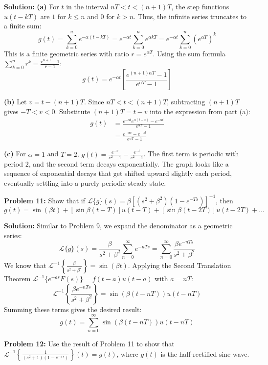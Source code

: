 \documentclass[11pt, letterpaper]{article}
\theoremstyle{definition}
\theoremstyle{remark}
\begin{document}
\textbf{Solution:}
\textbf{(a)} For $t$ in the interval $nT < t < (n+1)T$, the step functions $u(t-kT)$ are $1$ for $k \le n$ and $0$ for $k > n$. Thus, the infinite series truncates to a finite sum:
\[ g(t) = \sum_{k=0}^n e^{-\alpha(t-kT)} = e^{-\alpha t} \sum_{k=0}^n e^{\alpha kT} = e^{-\alpha t} \sum_{k=0}^n (e^{\alpha T})^k \]
This is a finite geometric series with ratio $r = e^{\alpha T}$. Using the sum formula $\sum_{k=0}^n r^k = \frac{r^{n+1} - 1}{r - 1}$:
\[ g(t) = e^{-\alpha t} \left[ \frac{e^{(n+1)\alpha T} - 1}{e^{\alpha T} - 1} \right] \]

\textbf{(b)} Let $v = t - (n+1)T$. Since $nT < t < (n+1)T$, subtracting $(n+1)T$ gives $-T < v < 0$.
Substitute $(n+1)T = t - v$ into the expression from part (a):
\begin{align*}
    g(t) &= \frac{e^{-\alpha t} e^{\alpha(t-v)} - e^{-\alpha t}}{e^{\alpha T} - 1} \\
    &= \frac{e^{-\alpha v} - e^{-\alpha t}}{e^{\alpha T} - 1}
\end{align*}

\textbf{(c)} For $\alpha = 1$ and $T = 2$, $g(t) = \frac{e^{-v}}{e^2 - 1} - \frac{e^{-t}}{e^2 - 1}$. The first term is periodic with period $2$, and the second term decays exponentially. The graph looks like a sequence of exponential decays that get shifted upward slightly each period, eventually settling into a purely periodic steady state.

\vspace{1em}
\textbf{Problem 11:} Show that if $\mathcal{L}\{g\}(s) = \beta[(s^2+\beta^2)(1-e^{-Ts})]^{-1}$, then
\[ g(t) = \sin(\beta t) + [\sin \beta(t-T)]u(t-T) + [\sin \beta(t-2T)]u(t-2T) + \dots \]

\textbf{Solution:}
Similar to Problem 9, we expand the denominator as a geometric series:
\[ \mathcal{L}\{g\}(s) = \frac{\beta}{s^2+\beta^2} \sum_{n=0}^\infty e^{-nTs} = \sum_{n=0}^\infty \frac{\beta e^{-nTs}}{s^2+\beta^2} \]
We know that $\mathcal{L}^{-1}\left\{ \frac{\beta}{s^2+\beta^2} \right\} = \sin(\beta t)$.
Applying the Second Translation Theorem $\mathcal{L}^{-1}\{ e^{-as} F(s) \} = f(t-a)u(t-a)$ with $a = nT$:
\[ \mathcal{L}^{-1}\left\{ \frac{\beta e^{-nTs}}{s^2+\beta^2} \right\} = \sin(\beta(t-nT)) u(t-nT) \]
Summing these terms gives the desired result:
\[ g(t) = \sum_{n=0}^\infty \sin(\beta(t-nT)) u(t-nT) \]

\vspace{1em}
\textbf{Problem 12:} Use the result of Problem 11 to show that $\mathcal{L}^{-1}\left\{ \frac{1}{(s^2+1)(1-e^{-\pi s})} \right\}(t) = g(t)$, where $g(t)$ is the half-rectified sine wave.
\end{document}
